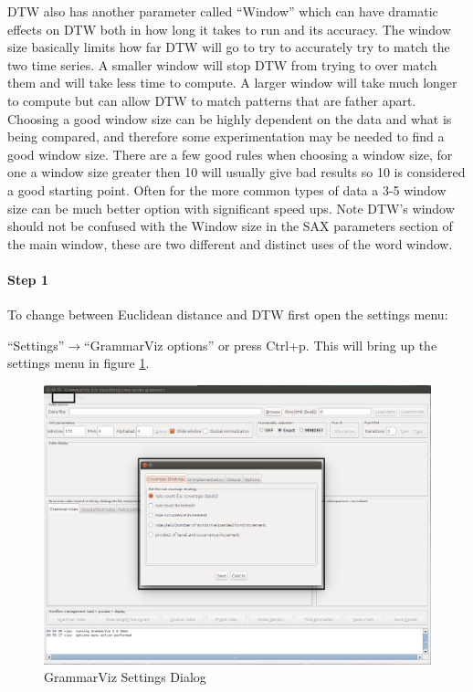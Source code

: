 \documentclass[letterpaper, 12pt]{article}
\begin{document}
DTW also has another parameter called ``Window'' which can have dramatic effects on DTW both in how long it takes to run and its accuracy. The window size basically limits how far DTW will go to try to accurately try to match the two time series. A smaller window will stop DTW from trying to over match them and will take less time to compute. A larger window will take much longer to compute but can allow DTW to match patterns that are father apart. Choosing a good window size can be highly dependent on the data and what is being compared, and therefore some experimentation may be needed to find a good window size. There are a few good rules when choosing a window size, for one a window size greater then 10 will usually give bad results so 10 is considered a good starting point. Often for the more common types of data a 3-5 window size can be much better option with significant speed ups. Note DTW's window should not be confused with the Window size in the SAX parameters section of the main window, these are two different and distinct uses of the word window. 

\newpage
\paragraph{Step 1}
To change between Euclidean distance and DTW first open the settings menu:

``Settings''$\rightarrow$``GrammarViz options'' or press Ctrl+p. This will bring up the settings menu in figure \ref{fig:grammarviz-settings-dialog}.

\begin{figure}[H]
  \includegraphics[width=\textwidth]{grammarviz-settings-dialog}
  \caption{GrammarViz Settings Dialog}
  \label{fig:grammarviz-settings-dialog}
\end{figure}
\end{document}
